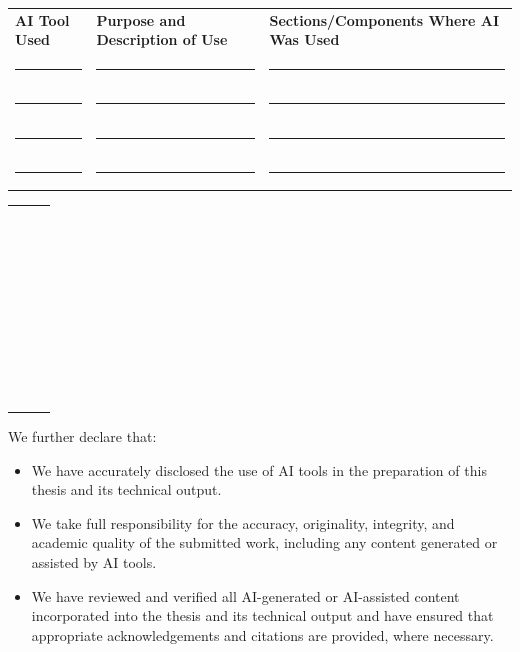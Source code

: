 \documentclass[11pt,letterpaper]{article}
\newif\iffilled
\begin{document}
\else
  \begin{tabularx}{\textwidth}{@{}p{3.8cm} X p{4.6cm}@{}}
    \textbf{AI Tool Used} & \textbf{Purpose and Description of Use} & \textbf{Sections/Components Where AI Was Used} \\[6pt]
    \rule{3.3cm}{0.4pt} & \rule{7.0cm}{0.4pt} & \rule{4.3cm}{0.4pt} \\[13pt]
    \rule{3.3cm}{0.4pt} & \rule{7.0cm}{0.4pt} & \rule{4.3cm}{0.4pt} \\[13pt]
    \rule{3.3cm}{0.4pt} & \rule{7.0cm}{0.4pt} & \rule{4.3cm}{0.4pt} \\[13pt]
    \rule{3.3cm}{0.4pt} & \rule{7.0cm}{0.4pt} & \rule{4.3cm}{0.4pt} \\
  \end{tabularx}

  \newpage %

  \vspace*{0.2cm}
  \begin{tabularx}{\textwidth}{@{}p{3.8cm} X p{4.6cm}@{}}
    \rule{3.3cm}{0.4pt} & \rule{7.0cm}{0.4pt} & \rule{4.3cm}{0.4pt} \\[13pt]
    \rule{3.3cm}{0.4pt} & \rule{7.0cm}{0.4pt} & \rule{4.3cm}{0.4pt} \\[13pt]
    \rule{3.3cm}{0.4pt} & \rule{7.0cm}{0.4pt} & \rule{4.3cm}{0.4pt} \\[13pt]
    \rule{3.3cm}{0.4pt} & \rule{7.0cm}{0.4pt} & \rule{4.3cm}{0.4pt} \\[13pt]
    \rule{3.3cm}{0.4pt} & \rule{7.0cm}{0.4pt} & \rule{4.3cm}{0.4pt} \\[13pt]
    \rule{3.3cm}{0.4pt} & \rule{7.0cm}{0.4pt} & \rule{4.3cm}{0.4pt} \\
  \end{tabularx}
\fi

\vspace{0.35cm}

\iffilled
  {\fontsize{10.5pt}{14.5pt}\selectfont We further declare that:\par}

  \begin{itemize}[leftmargin=1.6em, itemsep=3pt, topsep=1pt]
    \item We have accurately disclosed the use of AI tools in the preparation of this thesis and its technical output.
    \item We take full responsibility for the accuracy, originality, integrity, and academic quality of the submitted work, including any content generated or assisted by AI tools.
    \item We have reviewed and verified all AI-generated or AI-assisted content incorporated into the thesis and its technical output and have ensured that appropriate acknowledgements and citations are provided, where necessary.
  \end{itemize}
\end{document}
